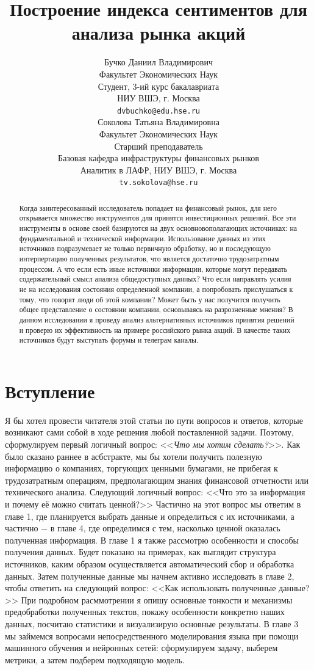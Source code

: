\documentclass{article}
\title{Построение индекса сентиментов для анализа рынка акций}
\author{
  Бучко Даниил Владимирович \\
  Факультет Экономических Наук\\
  Студент, 3-ий курс бакалавриата \\
  НИУ ВШЭ, г. Москва\\
  \texttt{dvbuchko@edu.hse.ru} \\
   \And
 Соколова Татьяна Владимировна \\
  Факультет Экономических Наук \\
  Старший преподаватель \\
  Базовая кафедра инфраструктуры финансовых рынков \\
  Аналитик в ЛАФР, НИУ ВШЭ, г. Москва \\
  \texttt{tv.sokolova@hse.ru} \\
}
\begin{document}
\maketitle

\begin{abstract}

Когда заинтересованный исследователь попадает на финансовый рынок, для него открывается множество инструментов для принятся инвестиционных решений. Все эти инструменты в основе своей базируются на двух основновополагающих источниках: на фундаментальной и технической информации. Использование данных из этих источников подразумевает не только первичную обработку, но и последующую интерпертацию полученных результатов, что является достаточно трудозатратным процессом. А что если есть иные источники информации, которые могут передавать содержательный смысл анализа общедоступных данных? Что если направлять усилия не на исследования состояния определенной компании, а попробовать прислушаться к тому, что говорят люди об этой компании? Может быть у нас получится получить общее представление о состоянии компании, основываясь на разрозненные мнения? В данном исследовании я проведу анализ альтернативных источников принятия решений и проверю их эффективность на примере российского рынка акций. В качестве таких источников будут выступать форумы и телеграм каналы.


\end{abstract}




\section*{Вступление}
Я бы хотел провести читателя этой статьи по пути вопросов и ответов, которые возникают сами собой в ходе решения любой поставленной задачи. Поэтому, сформулируем первый логичный вопрос: 
<<\emph{Что мы хотим сделать?}>>. Как было сказано раннее в асбстракте, мы бы хотели получить полезную информацию о компаниях, торгующих ценными бумагами, не прибегая к трудозатратным операциям, предполагающим знания финансовой отчетности или технического анализа. Следующий логичный вопрос: <<Что это за информация и почему её можно считать ценной?>> Частично на этот вопрос мы ответим в главе 1, где планируется выбрать данные и определиться с их источниками, а частично $-$ в главе 4, где определимся с тем, насколько ценной оказалась полученная информация. В главе 1 я также рассмотрю особенности и способы получения данных. Будет показано на примерах, как выглядит структура источников, каким образом осуществляется автоматический сбор и обработка данных. Затем полученные данные мы начнем активно исследовать в главе 2, чтобы ответить на следующий вопрос: <<Как использовать полученные данные?>> При подробном расммотрении я опишу основные тонкости и механизмы предобработки полученных текстов, покажу особенности конкретно наших данных, посчитаю статистики и визуализирую основные результаты. В главе 3 мы займемся вопросами непосредственного моделирования языка при помощи машинного обучения и нейронных сетей: сформулируем задачу, выберем метрики, а затем подберем подходящую модель. 
\end{document}
